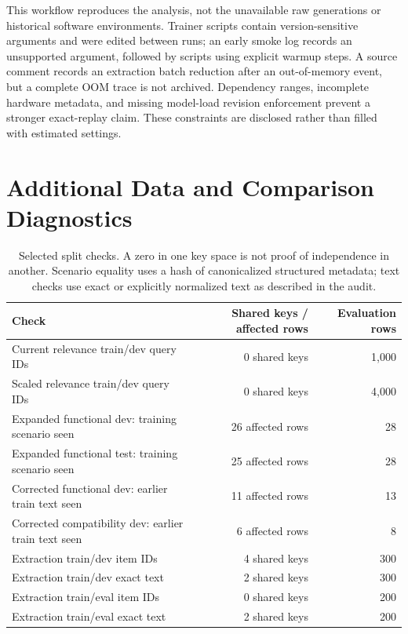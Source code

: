 This workflow reproduces the analysis, not the unavailable raw generations or historical software environments. Trainer scripts contain version-sensitive arguments and were edited between runs; an early smoke log records an unsupported  argument, followed by scripts using explicit warmup steps. A source comment records an extraction batch reduction after an out-of-memory event, but a complete OOM trace is not archived. Dependency ranges, incomplete hardware metadata, and missing model-load revision enforcement prevent a stronger exact-replay claim. These constraints are disclosed rather than filled with estimated settings.

\section{Additional Data and Comparison Diagnostics}
\label{app:data}
\begin{table}[h]
\centering\small
\caption{Selected split checks. A zero in one key space is not proof of independence in another. Scenario equality uses a hash of canonicalized structured metadata; text checks use exact or explicitly normalized text as described in the audit.}
\begin{tabularx}{\textwidth}{Yrr}
\toprule
Check & Shared keys / affected rows & Evaluation rows \\
\midrule
Current relevance train/dev query IDs & 0 shared keys & 1,000 \\
Scaled relevance train/dev query IDs & 0 shared keys & 4,000 \\
Expanded functional dev: training scenario seen & 26 affected rows & 28 \\
Expanded functional test: training scenario seen & 25 affected rows & 28 \\
Corrected functional dev: earlier train text seen & 11 affected rows & 13 \\
Corrected compatibility dev: earlier train text seen & 6 affected rows & 8 \\
Extraction train/dev item IDs & 4 shared keys & 300 \\
Extraction train/dev exact text & 2 shared keys & 300 \\
Extraction train/eval item IDs & 0 shared keys & 200 \\
Extraction train/eval exact text & 2 shared keys & 200 \\
\bottomrule
\end{tabularx}
\end{table}

